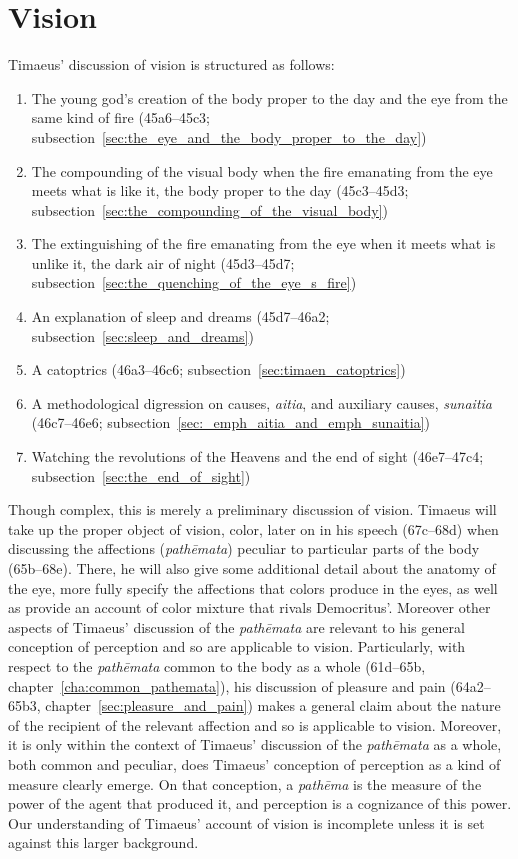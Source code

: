 
\section{Vision} %
\label{sec:vision}
Timaeus' discussion of vision is structured as follows:
\begin{enumerate}[(1)]
	\item The young god's creation of the body proper to the day and the eye from the same kind of fire (45a6--45c3; subsection~\ref{sec:the_eye_and_the_body_proper_to_the_day})
	\item The compounding of the visual body when the fire emanating from the eye meets what is like it, the body proper to the day (45c3--45d3; subsection~\ref{sec:the_compounding_of_the_visual_body})
	\item The extinguishing of the fire emanating from the eye when it meets what is unlike it, the dark air of night (45d3--45d7; subsection~\ref{sec:the_quenching_of_the_eye_s_fire})
	\item An explanation of sleep and dreams (45d7--46a2; subsection~\ref{sec:sleep_and_dreams})
	\item A catoptrics (46a3--46c6; subsection~\ref{sec:timaen_catoptrics})
	\item A methodological digression on causes, \emph{aitia}, and auxiliary causes, \emph{sunaitia} (46c7--46e6; subsection~\ref{sec:_emph_aitia_and_emph_sunaitia})
	\item Watching the revolutions of the Heavens and the end of sight (46e7--47c4; subsection~\ref{sec:the_end_of_sight})
\end{enumerate}
Though complex, this is merely a preliminary discussion of vision. Timaeus will take up the proper object of vision, color, later on in his speech (67c–68d) when discussing the affections (\emph{pathēmata}) peculiar to particular parts of the body (65b–68e). There, he will also give some additional detail about the anatomy of the eye, more fully specify the affections that colors produce in the eyes, as well as provide an account of color mixture that rivals Democritus'. Moreover other aspects of Timaeus' discussion of the \emph{pathēmata} are relevant to his general conception of perception and so are applicable to vision. Particularly, with respect to the \emph{pathēmata} common to the body as a whole (61d–65b, chapter~\ref{cha:common_pathemata}), his discussion of pleasure and pain (64a2–65b3, chapter~\ref{sec:pleasure_and_pain}) makes a general claim about the nature of the recipient of the relevant affection and so is applicable to vision. Moreover, it is only within the context of Timaeus' discussion of the \emph{pathēmata} as a whole, both common and peculiar, does Timaeus' conception of perception as a kind of measure clearly emerge. On that conception, a \emph{pathēma} is the measure of the power of the agent that produced it, and perception is a cognizance of this power. Our understanding of Timaeus' account of vision is incomplete unless it is set against this larger background.

